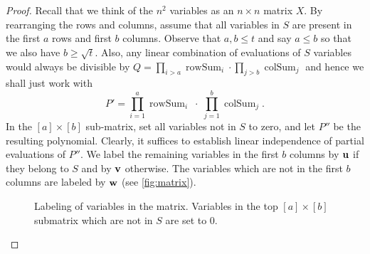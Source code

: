\documentclass[11pt]{article}
\def\rowsum{\operatorname{rowSum}}
\def\colsum{\operatorname{colSum}}
\begin{document}
\begin{proof}
Recall that we think of the $n^2$ variables as an $n\times n$ matrix $X$.
By rearranging the rows and columns, assume that all variables in $S$ are present in the first $a$ rows and first $b$ columns.
Observe that $a,b \leq t$ and say $a \leq b$ so that we also have $b \geq \sqrt{t}$.
Also, any linear combination of evaluations of $S$ variables would always be divisible by $Q = \prod_{i>a} \rowsum_i \cdot \prod_{j > b} \colsum_j$ and hence we shall just work with 
\[
P' = \prod_{i=1}^a \rowsum_i \;\cdot\; \prod_{j=1}^b \colsum_j.
\]
In the $[a]\times[b]$ sub-matrix, set all variables not in $S$ to zero, and let $P''$ be the resulting polynomial.
Clearly, it suffices to establish linear independence of partial evaluations of $P''$. We label the remaining variables in the first $b$ columns by $\mathbf{u}$ if they belong to $S$ and by $\mathbf{v}$ otherwise. The variables which are not in the first $b$ columns are labeled by $\mathbf{w}$ (see \autoref{fig:matrix}).

\begin{figure}[h]
\begin{center}
\caption{Labeling of variables in the matrix. Variables in the top $[a] \times [b]$ submatrix which are not in $S$ are set to $0$.}
\label{fig:matrix}
\end{center}
\end{figure}



\end{proof}
\end{document}
